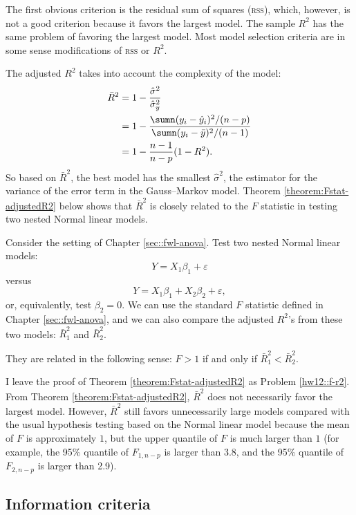 The first obvious criterion is the residual sum of squares (\textsc{rss}), which, however, is not a good criterion because it favors the largest model. 
The sample $R^{2}$ has the same problem of favoring the largest model.
Most model selection criteria are in some sense modifications of \textsc{rss} or $R^2$.

 
The adjusted $R^{2}$ takes into account the complexity of the model:
\begin{align*}
\bar{R}^{2} 
 & =1-\frac{\hat{\sigma}^{2}}{\hat{\sigma}_{y}^{2}} \\ 
  & =1-\frac{\sumn(y_{i}-\hat{y}_{i})^{2}/(n-p)}{\sumn(y_{i}-\bar{y})^{2}/(n-1)}\\
& =1-\frac{n-1}{n-p}(1-R^{2}) . 
\end{align*}
So based on $\bar{R}^{2}$, the best model has the smallest $\hat{\sigma}^{2}$,
the estimator for the variance of the error term in the Gauss--Markov
model. Theorem \ref{theorem:Fstat-adjustedR2} below shows that $\bar{R}^{2}$ is closely related to the $F$ statistic in
testing two nested Normal linear models. 


\begin{theorem}
\label{theorem:Fstat-adjustedR2} 
Consider the setting of Chapter \ref{sec::fwl-anova}.
Test two nested Normal linear
models:
\[
Y=X_{1}\beta_{1}+\varepsilon
\]
versus
\[
Y=X_{1}\beta_{1}+X_{2}\beta_{2}+\varepsilon,
\]
or, equivalently, test $\beta_{2}=0$. We can use the standard
$F$ statistic defined in Chapter \ref{sec::fwl-anova}, and we can also compare the adjusted $R^{2}$'s from
these two models: $\bar{R}_{1}^{2}$ and $\bar{R}_{2}^{2}$. 

They are related in the following sense: $F>1$ if and only if $\bar{R}_{1}^{2}<\bar{R}_{2}^{2}$. 
\end{theorem}


I leave the proof of Theorem \ref{theorem:Fstat-adjustedR2} as Problem \ref{hw12::f-r2}. 
From Theorem \ref{theorem:Fstat-adjustedR2}, $\bar{R}^{2}$ does not necessarily favor the largest model. However, $\bar{R}^{2}$ still
favors unnecessarily large models compared with the usual
hypothesis testing based on the Normal linear model because the mean of $F$ is approximately $1$, but the upper
quantile of $F$ is much larger than $1$ (for example, the 95\% quantile of $F_{1,n-p}$ is larger than 3.8, and the 95\% quantile of $F_{2,n-p}$ is larger than 2.9). 



\subsection{Information criteria}
\label{chapter::aic-bic}


